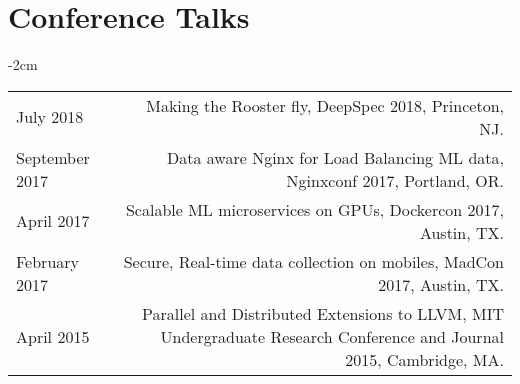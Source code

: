 \documentclass[lettersize,10pt]{article}
\begin{document}
\section{Conference Talks}
\begin{adjustwidth}{}{-2cm}
  \begin{tabularx}{\textwidth}{L R}
    July 2018      & {\sc Making the Rooster fly}, DeepSpec 2018, Princeton, NJ. \\
    September 2017 & {\sc Data aware Nginx for Load Balancing ML data}, Nginxconf 2017, Portland, OR. \\
    April 2017     & {\sc Scalable ML microservices on GPUs}, Dockercon 2017, Austin, TX. \\
    February 2017  & {\sc Secure, Real-time data collection on mobiles}, MadCon 2017, Austin, TX. \\
    April 2015     & {\sc Parallel and Distributed Extensions to LLVM}, MIT Undergraduate Research Conference and Journal 2015, Cambridge, MA. \\
  \end{tabularx}
\end{adjustwidth}

\end{document}
